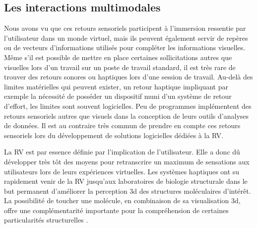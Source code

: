 
\subsection{Les interactions multimodales}


Nous avons vu que ces retours sensoriels participent à l'immersion ressentie par l'utilisateur dans un monde virtuel, mais ils peuvent également servir de repères ou de vecteurs d'informations utilisés pour compléter les informations visuelles. Même s'il est possible de mettre en place certaines sollicitations autres que visuelles lors d'un travail sur un poste de travail standard, il est très rare de trouver des retours sonores ou haptiques lors d'une session de travail. Au-delà des limites matérielles qui peuvent exister, un retour haptique impliquant par exemple la nécessité de posséder un dispositif muni d'un système de retour d'effort, les limites sont souvent logicielles. Peu de programmes implémentent des retours sensoriels autres que visuels dans la conception de leurs outils d'analyses de données. Il est au contraire très commun de prendre en compte ces retours sensoriels lors du développement de solutions logicielles dédiées à la RV. 

La RV est par essence définie par l'implication de l'utilisateur. Elle a donc dû développer très tôt des moyens pour retranscrire un maximum de sensations aux utilisateurs lors de leurs expériences virtuelles. Les systèmes haptiques ont su rapidement venir de la RV jusqu'aux laboratoires de biologie structurale dans le but permanent d'améliorer la perception 3d des structures moléculaires d'intérêt. La possibilité de toucher une molécule, en combinaison de sa visualisation 3d, offre une complémentarité importante pour la compréhension de certaines particularités structurelles \cite{stocks2009interacting}.

